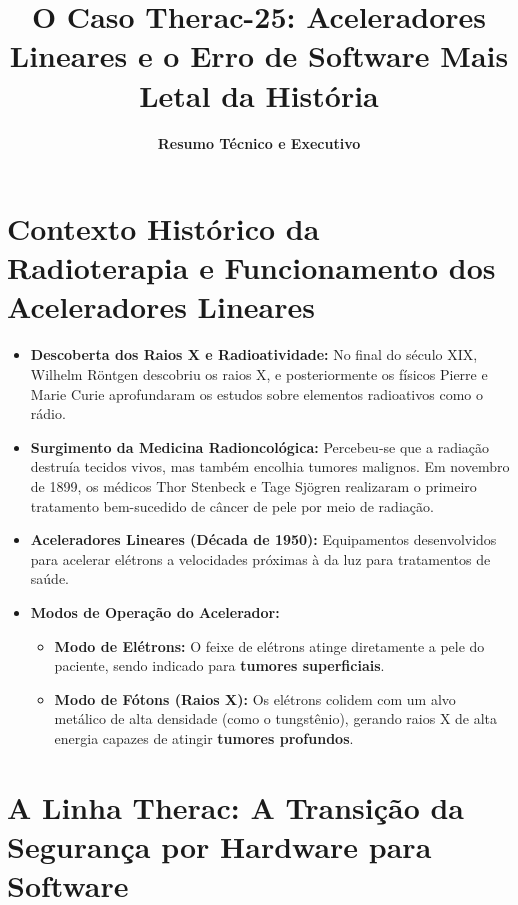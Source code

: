 \documentclass[12pt, a4paper]{article}
\title{\textbf{O Caso Therac-25: Aceleradores Lineares e o Erro de Software Mais Letal da História}}
\author{\textbf{Resumo Técnico e Executivo}}
\date{}
\begin{document}
\maketitle

\section{Contexto Histórico da Radioterapia e Funcionamento dos Aceleradores Lineares}

\begin{itemize}
    \item \textbf{Descoberta dos Raios X e Radioatividade:} No final do século XIX, Wilhelm Röntgen descobriu os raios X, e posteriormente os físicos Pierre e Marie Curie aprofundaram os estudos sobre elementos radioativos como o rádio.
    \item \textbf{Surgimento da Medicina Radioncológica:} Percebeu-se que a radiação destruía tecidos vivos, mas também encolhia tumores malignos. Em novembro de 1899, os médicos Thor Stenbeck e Tage Sjögren realizaram o primeiro tratamento bem-sucedido de câncer de pele por meio de radiação.
    \item \textbf{Aceleradores Lineares (Década de 1950):} Equipamentos desenvolvidos para acelerar elétrons a velocidades próximas à da luz para tratamentos de saúde.
    \item \textbf{Modos de Operação do Acelerador:}
    \begin{itemize}
        \item \textbf{Modo de Elétrons:} O feixe de elétrons atinge diretamente a pele do paciente, sendo indicado para \textbf{tumores superficiais}.
        \item \textbf{Modo de Fótons (Raios X):} Os elétrons colidem com um alvo metálico de alta densidade (como o tungstênio), gerando raios X de alta energia capazes de atingir \textbf{tumores profundos}.
    \end{itemize}
\end{itemize}

\section{A Linha Therac: A Transição da Segurança por Hardware para Software}
\end{document}
